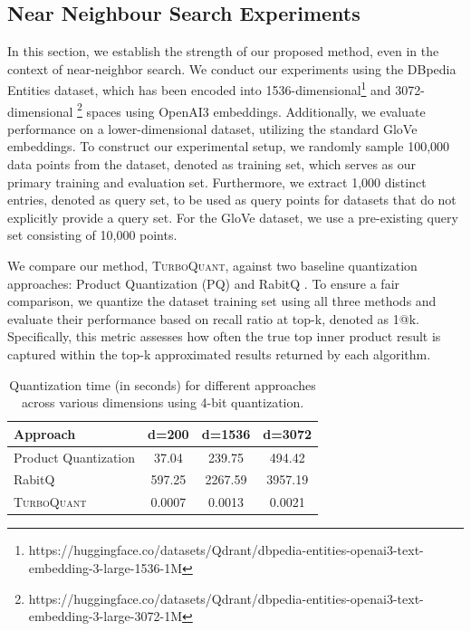 \documentclass[11pt]{article}
\newcommand{\TurboQuant}{\textsc{TurboQuant}\xspace}
\begin{document}
\subsection{Near Neighbour Search Experiments}
\label{sec:nn_exp}
In this section, we establish the strength of our proposed method, even in the context of near-neighbor search. We conduct our experiments using the DBpedia \cite{thakur2021beir} Entities dataset, which has been encoded into 1536-dimensional\footnote{https://huggingface.co/datasets/Qdrant/dbpedia-entities-openai3-text-embedding-3-large-1536-1M} and 3072-dimensional \footnote{https://huggingface.co/datasets/Qdrant/dbpedia-entities-openai3-text-embedding-3-large-3072-1M} spaces using OpenAI3 embeddings. Additionally, we evaluate performance on a lower-dimensional dataset, utilizing the standard GloVe \cite{pennington2014glove} embeddings.
To construct our experimental setup, we randomly sample 100,000 data points from the dataset, denoted as training set, which serves as our primary training and evaluation set. Furthermore, we extract 1,000 distinct entries, denoted as query set, to be used as query points for datasets that do not explicitly provide a query set. For the GloVe dataset, we use a pre-existing query set consisting of 10,000 points.

We compare our method, \TurboQuant, against two baseline quantization approaches: Product Quantization (PQ) and RabitQ \cite{gao2024practical}. To ensure a fair comparison, we quantize the dataset training set using all three methods and evaluate their performance based on recall ratio at top-k, denoted as 1@k. Specifically, this metric assesses how often the true top inner product result is captured within the top-k approximated results returned by each algorithm.

\begin{table}[ht]
    \centering
    \begin{tabular}{lccc}
        \toprule
        Approach & d=200 & d=1536 & d=3072 \\
        \midrule
        Product Quantization & 37.04 & 239.75 & 494.42 \\
        RabitQ & 597.25 & 2267.59 & 3957.19 \\
        \TurboQuant & 0.0007 & 0.0013 & 0.0021 \\
        \bottomrule
    \end{tabular}
    \caption{Quantization time (in seconds) for different approaches across various dimensions using 4-bit quantization.}
    \label{tab:quantizing_time}
\end{table}
\end{document}
